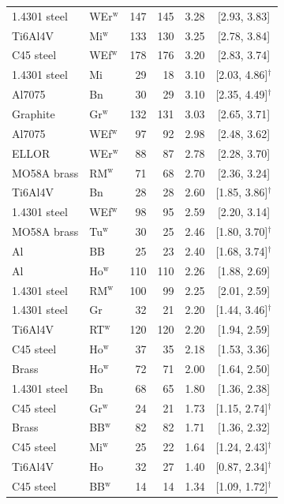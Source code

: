 \documentclass[final,1p,times]{elsarticle}
\theoremstyle{definition}
\begin{document}
\begin{table}[htbp]
\begin{tabular}{@{}llrrrc@{}}
    1.4301 steel & WEr$^{\text{w}}$ & 147 & 145 & 3.28 & [2.93, 3.83] \\
    Ti6Al4V & Mi$^{\text{w}}$ & 133 & 130 & 3.25 & [2.78, 3.84] \\
    C45 steel & WEf$^{\text{w}}$ & 178 & 176 & 3.20 & [2.83, 3.74] \\
    1.4301 steel & Mi & 29 & 18 & 3.10 & [2.03, 4.86]$^{\dagger}$ \\
    Al7075 & Bn & 30 & 29 & 3.10 & [2.35, 4.49]$^{\dagger}$ \\
    Graphite & Gr$^{\text{w}}$ & 132 & 131 & 3.03 & [2.65, 3.71] \\
    Al7075 & WEf$^{\text{w}}$ & 97 & 92 & 2.98 & [2.48, 3.62] \\
    ELLOR & WEr$^{\text{w}}$ & 88 & 87 & 2.78 & [2.28, 3.70] \\
    MO58A brass & RM$^{\text{w}}$ & 71 & 68 & 2.70 & [2.36, 3.24] \\
    Ti6Al4V & Bn & 28 & 28 & 2.60 & [1.85, 3.86]$^{\dagger}$ \\
    1.4301 steel & WEf$^{\text{w}}$ & 98 & 95 & 2.59 & [2.20, 3.14] \\
    MO58A brass & Tu$^{\text{w}}$ & 30 & 25 & 2.46 & [1.80, 3.70]$^{\dagger}$ \\
    Al & BB & 25 & 23 & 2.40 & [1.68, 3.74]$^{\dagger}$ \\
    Al & Ho$^{\text{w}}$ & 110 & 110 & 2.26 & [1.88, 2.69] \\
    1.4301 steel & RM$^{\text{w}}$ & 100 & 99 & 2.25 & [2.01, 2.59] \\
    1.4301 steel & Gr & 32 & 21 & 2.20 & [1.44, 3.46]$^{\dagger}$ \\
    Ti6Al4V & RT$^{\text{w}}$ & 120 & 120 & 2.20 & [1.94, 2.59] \\
    C45 steel & Ho$^{\text{w}}$ & 37 & 35 & 2.18 & [1.53, 3.36] \\
    Brass & Ho$^{\text{w}}$ & 72 & 71 & 2.00 & [1.64, 2.50] \\
    1.4301 steel & Bn & 68 & 65 & 1.80 & [1.36, 2.38] \\
    C45 steel & Gr$^{\text{w}}$ & 24 & 21 & 1.73 & [1.15, 2.74]$^{\dagger}$ \\
    Brass & BB$^{\text{w}}$ & 82 & 82 & 1.71 & [1.36, 2.32] \\
    C45 steel & Mi$^{\text{w}}$ & 25 & 22 & 1.64 & [1.24, 2.43]$^{\dagger}$ \\
    Ti6Al4V & Ho & 32 & 27 & 1.40 & [0.87, 2.34]$^{\dagger}$ \\
    C45 steel & BB$^{\text{w}}$ & 14 & 14 & 1.34 & [1.09, 1.72]$^{\dagger}$ \\

\end{tabular}
\end{table}
\end{document}
